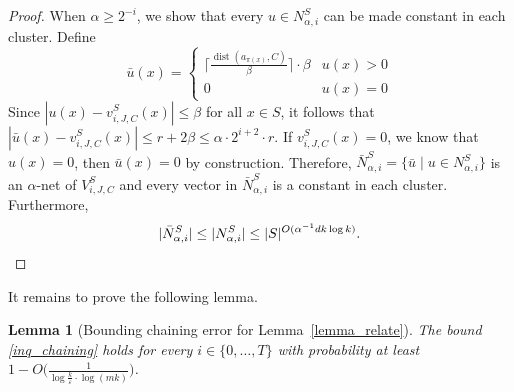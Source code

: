 \documentclass[11pt,letterpaper]{article}
\newtheorem{lemma}[theorem]{Lemma}
\theoremstyle{definition}
\newcommand{\eps}{\varepsilon}
\DeclareMathOperator{\dist}{dist}
\DeclarePairedDelimiter{\abs}{\lvert}{\rvert}
\begin{document}
\begin{proof}
When $\alpha\geq 2^{-i}$, we show that every $u\in N_{\alpha,i}^S$ can be made constant in each cluster. Define 
\[
\bar{u}(x)=
\begin{cases}
    \lceil \frac{\dist(a_{\pi(x)},C)}{\beta}\rceil\cdot \beta & u(x)>0\\
    0 & u(x)=0
\end{cases}
\]
Since $|u(x)-v_{i,J,C}^S(x)|\leq \beta$ for all $x\in S$, it follows that 
$|\bar{u}(x)-v_{i,J,C}^S(x)|\leq r + 2\beta\leq \alpha\cdot 2^{i+2}\cdot r$. 
If $v_{i,J,C}^S(x)=0$, we know that $u(x)=0$, then $\bar{u}(x)=0$ by construction.
Therefore, $\bar{N}_{\alpha,i}^S=\{\bar{u}\mid u\in N_{\alpha,i}^S\}$ is an $\alpha$-net of $V_{i,J,C}^S$ and every vector in  $\bar{N}_{\alpha,i}^S$ is a constant in each cluster. Furthermore,
\[
 \abs{\bar{N}_{\alpha,i}^S} \leq |N_{\alpha,i}^S|\leq |S|^{O(\alpha^{-1}dk\log k)}. \qedhere
\]
\end{proof}

It remains to prove the following lemma.

\begin{lemma}[Bounding chaining error for Lemma~\ref{lemma_relate}] 
\label{lemma_chaining}
The bound \eqref{inq_chaining} holds for every $i\in \{0,\dots,T\}$ with probability at least $1-O\big(\frac{1}{\log \frac{k}{\eps}\cdot \log (mk)}\big)$.
\end{lemma}
\end{document}
